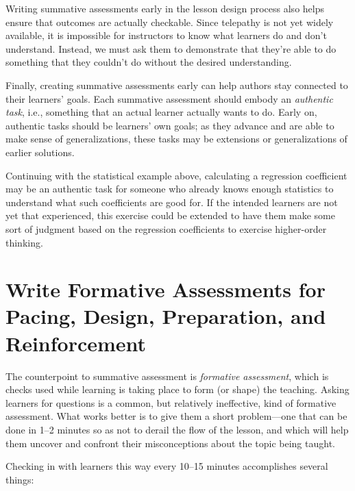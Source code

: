\documentclass[10pt,letterpaper]{article}
\newcommand{\rulemajor}[1]{\section{#1}}
\begin{document}
Writing summative assessments early in the lesson design process also helps
ensure that outcomes are actually checkable.  Since telepathy is not yet widely
available, it is impossible for instructors to know what learners do and don't
understand.  Instead, we must ask them to demonstrate that they're able to do
something that they couldn't do without the desired understanding.

Finally, creating summative assessments early can help authors stay connected to
their learners' goals.  Each summative assessment should embody an
\emph{authentic task}, i.e., something that an actual learner actually wants to
do.  Early on, authentic tasks should be learners' own goals; as they advance
and are able to make sense of generalizations, these tasks may be extensions or
generalizations of earlier solutions.

Continuing with the statistical example above, calculating a regression
coefficient may be an authentic task for someone who already knows enough
statistics to understand what such coefficients are good for.  If the intended
learners are not yet that experienced, this exercise could be extended to have
them make some sort of judgment based on the regression coefficients to exercise
higher-order thinking.

\rulemajor{Write Formative Assessments for Pacing, Design, Preparation, and Reinforcement}

The counterpoint to summative assessment is \emph{formative assessment}, which
is checks used while learning is taking place to form (or shape) the teaching.
Asking learners for questions is a common, but relatively ineffective, kind of
formative assessment.  What works better is to give them a short problem---one
that can be done in 1--2 minutes so as not to derail the flow of the lesson, and
which will help them uncover and confront their misconceptions about the topic
being taught.

Checking in with learners this way every 10--15 minutes accomplishes several
things:
\end{document}

